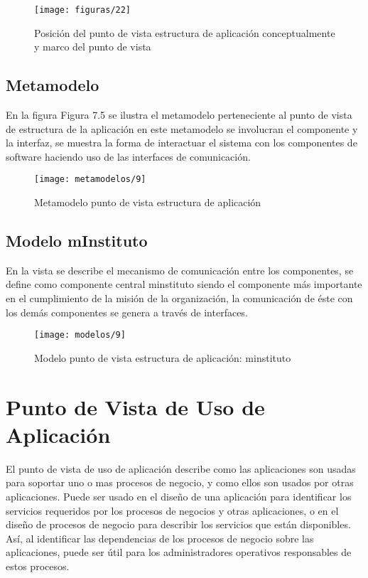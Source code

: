   \begin{figure}[H]
	\centering
	\texttt{[image: figuras/22]}
	\captionsetup{width=.95\textwidth}
	\caption{Posición del punto de vista estructura de aplicación conceptualmente y marco del punto de vista}
	\label{figura22}
  \end{figure}

  \subsection{Metamodelo}
  En la figura Figura 7.5 se ilustra el metamodelo perteneciente al punto de vista de estructura de la aplicación en este metamodelo se involucran el componente y la interfaz, se muestra la forma de interactuar el sistema con los componentes de software haciendo uso de las interfaces de comunicación.

  \begin{figure}[H]
	\centering
	\texttt{[image: metamodelos/9]}
	\captionsetup{width=.95\textwidth}
	\caption{Metamodelo punto de vista estructura de aplicación}
	\label{metamodelo9}
  \end{figure}

  \subsection{Modelo mInstituto}
  En la vista se describe el mecanismo de comunicación entre los componentes, se define como componente central minstituto siendo el componente más importante en el cumplimiento de la misión de la organización, la comunicación de éste con los demás componentes se genera a través de interfaces.
  
  \begin{figure}[H]
	\centering
	\texttt{[image: modelos/9]}
	\captionsetup{width=.95\textwidth}
	\caption{Modelo punto de vista estructura de aplicación: minstituto}
	\label{modelo9}
  \end{figure}
  
  \section{Punto de Vista de Uso de Aplicación}
  El punto de vista de uso de aplicación describe como las aplicaciones son usadas para soportar uno o mas procesos de negocio, y como ellos son usados por otras aplicaciones. Puede ser usado en el diseño de una aplicación para identificar los servicios requeridos por los procesos de negocios y otras aplicaciones, o en el diseño de procesos de negocio para describir los servicios que están disponibles. Así, al identificar las dependencias de los procesos de negocio sobre las aplicaciones, puede ser útil para los administradores operativos responsables de estos procesos.
  
